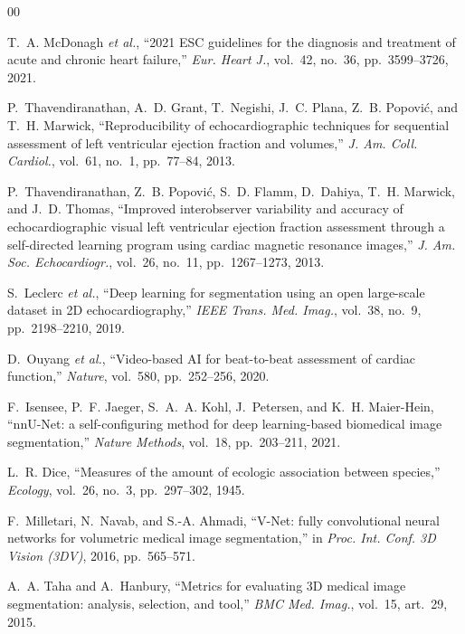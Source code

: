 \documentclass[conference,a4paper]{IEEEtran}
\begin{document}
\begin{thebibliography}{00}

 T.~A. McDonagh \emph{et al.}, ``2021 ESC guidelines for the diagnosis
and treatment of acute and chronic heart failure,'' \emph{Eur. Heart J.}, vol.~42, no.~36,
pp.~3599--3726, 2021.

 P.~Thavendiranathan, A.~D. Grant, T.~Negishi, J.~C. Plana,
Z.~B. Popovi\'{c}, and T.~H. Marwick, ``Reproducibility of echocardiographic techniques for
sequential assessment of left ventricular ejection fraction and volumes,'' \emph{J. Am.
Coll. Cardiol.}, vol.~61, no.~1, pp.~77--84, 2013.

 P.~Thavendiranathan, Z.~B. Popovi\'{c}, S.~D. Flamm,
D.~Dahiya, T.~H. Marwick, and J.~D. Thomas, ``Improved interobserver variability and
accuracy of echocardiographic visual left ventricular ejection fraction assessment through a
self-directed learning program using cardiac magnetic resonance images,'' \emph{J. Am. Soc.
Echocardiogr.}, vol.~26, no.~11, pp.~1267--1273, 2013.

 S.~Leclerc \emph{et al.}, ``Deep learning for segmentation using an
open large-scale dataset in 2D echocardiography,'' \emph{IEEE Trans. Med. Imag.}, vol.~38,
no.~9, pp.~2198--2210, 2019.

 D.~Ouyang \emph{et al.}, ``Video-based AI for beat-to-beat assessment
of cardiac function,'' \emph{Nature}, vol.~580, pp.~252--256, 2020.

 F.~Isensee, P.~F. Jaeger, S.~A.~A. Kohl, J.~Petersen, and
K.~H. Maier-Hein, ``nnU-Net: a self-configuring method for deep learning-based biomedical
image segmentation,'' \emph{Nature Methods}, vol.~18, pp.~203--211, 2021.

 L.~R. Dice, ``Measures of the amount of ecologic association between
species,'' \emph{Ecology}, vol.~26, no.~3, pp.~297--302, 1945.

 F.~Milletari, N.~Navab, and S.-A. Ahmadi, ``V-Net: fully
convolutional neural networks for volumetric medical image segmentation,'' in
\emph{Proc. Int. Conf. 3D Vision (3DV)}, 2016, pp.~565--571.

 A.~A. Taha and A.~Hanbury, ``Metrics for evaluating 3D medical image
segmentation: analysis, selection, and tool,'' \emph{BMC Med. Imag.}, vol.~15, art.~29,
2015.


\end{thebibliography}
\end{document}
